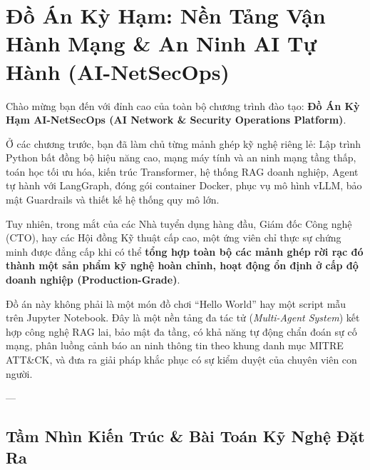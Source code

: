 
\chapter{Đồ Án Kỳ Hạm: Nền Tảng Vận Hành Mạng \& An Ninh AI Tự Hành (AI-NetSecOps)}
\label{ch:flagship-capstone}

Chào mừng bạn đến với đỉnh cao của toàn bộ chương trình đào tạo: \textbf{Đồ Án Kỳ Hạm AI-NetSecOps (AI Network \& Security Operations Platform)}.

Ở các chương trước, bạn đã làm chủ từng mảnh ghép kỹ nghệ riêng lẻ: Lập trình Python bất đồng bộ hiệu năng cao, mạng máy tính và an ninh mạng tầng thấp, toán học tối ưu hóa, kiến trúc Transformer, hệ thống RAG doanh nghiệp, Agent tự hành với LangGraph, đóng gói container Docker, phục vụ mô hình vLLM, bảo mật Guardrails và thiết kế hệ thống quy mô lớn. 

Tuy nhiên, trong mắt của các Nhà tuyển dụng hàng đầu, Giám đốc Công nghệ (CTO), hay các Hội đồng Kỹ thuật cấp cao, một ứng viên chỉ thực sự chứng minh được đẳng cấp khi có thể \textbf{tổng hợp toàn bộ các mảnh ghép rời rạc đó thành một sản phẩm kỹ nghệ hoàn chỉnh, hoạt động ổn định ở cấp độ doanh nghiệp (Production-Grade)}.

Đồ án này không phải là một món đồ chơi ``Hello World'' hay một script mẫu trên Jupyter Notebook. Đây là một nền tảng đa tác tử (\textit{Multi-Agent System}) kết hợp công nghệ RAG lai, bảo mật đa tầng, có khả năng tự động chẩn đoán sự cố mạng, phân luồng cảnh báo an ninh thông tin theo khung danh mục MITRE ATT\&CK, và đưa ra giải pháp khắc phục có sự kiểm duyệt của chuyên viên con người.

---

\section{Tầm Nhìn Kiến Trúc \& Bài Toán Kỹ Nghệ Đặt Ra}
\label{sec:ch14-vision}

